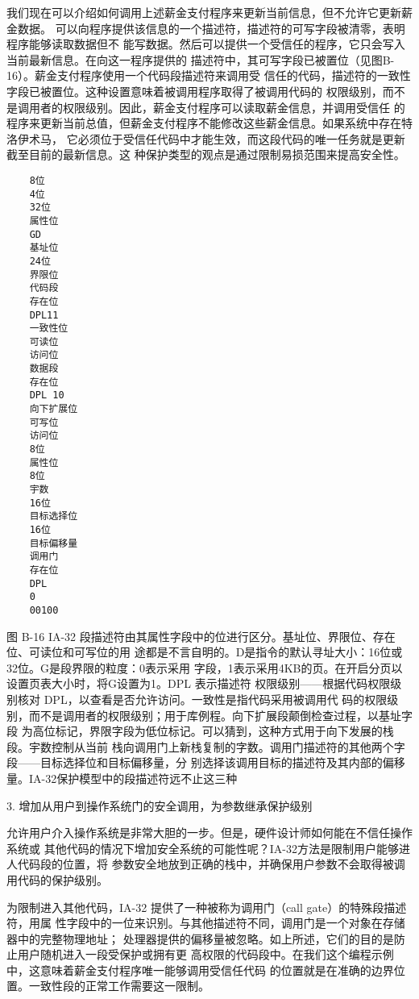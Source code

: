 我们现在可以介绍如何调用上述薪金支付程序来更新当前信息，但不允许它更新薪金数据。
可以向程序提供该信息的一个描述符，描述符的可写字段被清零，表明程序能够读取数据但不
能写数据。然后可以提供一个受信任的程序，它只会写入当前最新信息。在向这一程序提供的
描述符中，其可写字段已被置位（见图B-16）。薪金支付程序使用一个代码段描述符来调用受
信任的代码，描述符的一致性字段已被置位。这种设置意味着被调用程序取得了被调用代码的
权限级别，而不是调用者的权限级别。因此，薪金支付程序可以读取薪金信息，并调用受信任
的程序来更新当前总值，但薪金支付程序不能修改这些薪金信息。如果系统中存在特洛伊术马，
它必须位于受信任代码中才能生效，而这段代码的唯一任务就是更新截至目前的最新信息。这
种保护类型的观点是通过限制易损范围来提高安全性。

\begin{verbatim}
    8位
    4位
    32位
    属性位
    GD
    基址位
    24位
    界限位
    代码段
    存在位
    DPL11
    一致性位
    可读位
    访问位
    数据段
    存在位
    DPL 10
    向下扩展位
    可写位
    访问位
    8位
    属性位
    8位
    宇数
    16位
    目标选择位
    16位
    目标偏移量
    调用门
    存在位
    DPL
    0
    00100
\end{verbatim}
图 B-16 IA-32 段描述符由其属性字段中的位进行区分。基址位、界限位、存在位、可读位和可写位的用
途都是不言自明的。D是指令的默认寻址大小：16位或32位。G是段界限的粒度：0表示采用
字段，1表示采用4KB的页。在开启分页以设置页表大小时，将G设置为1。DPL 表示描述符
权限级别——根据代码权限级别核对 DPL，以查看是否允许访问。一致性是指代码采用被调用代
码的权限级别，而不是调用者的权限级别；用于库例程。向下扩展段颠倒检查过程，以基址字段
为高位标记，界限字段为低位标记。可以猜到，这种方式用于向下发展的栈段。宇数控制从当前
栈向调用门上新栈复制的字数。调用门描述符的其他两个字段——目标选择位和目标偏移量，分
别选择该调用目标的描述符及其内部的偏移量。IA-32保护模型中的段描述符远不止这三种

3. 增加从用户到操作系统门的安全调用，为参数继承保护级别

允许用户介入操作系统是非常大胆的一步。但是，硬件设计师如何能在不信任操作系统或
其他代码的情况下增加安全系统的可能性呢？IA-32方法是限制用户能够进人代码段的位置，将
参数安全地放到正确的栈中，并确保用户参数不会取得被调用代码的保护级别。

为限制进入其他代码，IA-32 提供了一种被称为调用门（call gate）的特殊段描述符，用属
性字段中的一位来识别。与其他描述符不同，调用门是一个对象在存储器中的完整物理地址；
处理器提供的偏移量被忽略。如上所述，它们的目的是防止用户随机进入一段受保护或拥有更
高权限的代码段中。在我们这个编程示例中，这意味着薪金支付程序唯一能够调用受信任代码
的位置就是在准确的边界位置。一致性段的正常工作需要这一限制。

